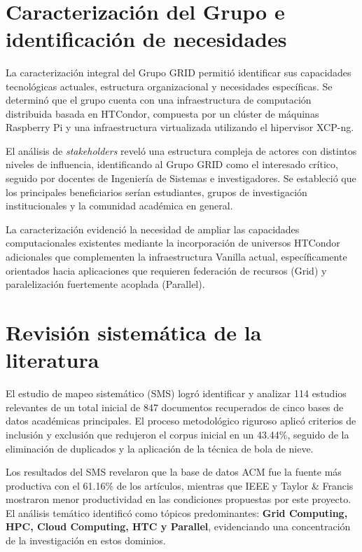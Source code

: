\label{cap:resultados}
\mbox{}\\

\section{Caracterización del Grupo \GRID e identificación de necesidades}
\noindent

La caracterización integral del Grupo GRID permitió identificar sus capacidades tecnológicas actuales, estructura organizacional y necesidades específicas. Se determinó que el grupo cuenta con una infraestructura de computación distribuida basada en HTCondor, compuesta por un clúster de máquinas Raspberry Pi y una infraestructura virtualizada utilizando el hipervisor XCP-ng. 

El análisis de \textit{stakeholders} reveló una estructura compleja de actores con distintos niveles de influencia, identificando al Grupo GRID como el interesado crítico, seguido por docentes de Ingeniería de Sistemas e investigadores. Se estableció que los principales beneficiarios serían estudiantes, grupos de investigación institucionales y la comunidad académica en general.

La caracterización evidenció la necesidad de ampliar las capacidades computacionales existentes mediante la incorporación de universos HTCondor adicionales que complementen la infraestructura Vanilla actual, específicamente orientados hacia aplicaciones que requieren federación de recursos (Grid) y paralelización fuertemente acoplada (Parallel).

\section{Revisión sistemática de la literatura}
\noindent

El estudio de mapeo sistemático (SMS) logró identificar y analizar 114 estudios relevantes de un total inicial de 847 documentos recuperados de cinco bases de datos académicas principales. El proceso metodológico riguroso aplicó criterios de inclusión y exclusión que redujeron el corpus inicial en un 43.44\%, seguido de la eliminación de duplicados y la aplicación de la técnica de bola de nieve.

Los resultados del SMS revelaron que la base de datos ACM fue la fuente más productiva con el 61.16\% de los artículos, mientras que IEEE y Taylor \& Francis mostraron menor productividad en las condiciones propuestas por este proyecto. El análisis temático identificó como tópicos predominantes: \textbf{Grid Computing, HPC, Cloud Computing, HTC y Parallel}, evidenciando una concentración de la investigación en estos dominios.

